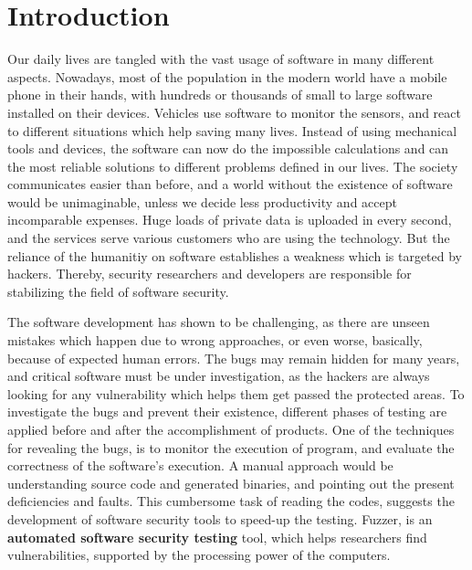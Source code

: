 \section{Introduction}
\label{sec:intro}


Our daily lives are tangled with the vast usage of software in many different aspects. Nowadays, most of the population in the modern world have a mobile phone in their hands, with hundreds or thousands of small to large software installed on their devices. Vehicles use software to monitor the sensors, and react to different situations which help saving many lives. Instead of using mechanical tools and devices, the software can now do the impossible calculations and can the most reliable solutions to different problems defined in our lives. The society communicates easier than before, and a world without the existence of software would be unimaginable, unless we decide less productivity and accept incomparable expenses. Huge loads of private data is uploaded in every second, and the services serve various customers who are using the technology. But the reliance of the humanitiy on software establishes a weakness which is targeted by hackers. Thereby, security researchers and developers are responsible for stabilizing the field of software security.


The software development has shown to be challenging, as there are unseen mistakes which happen due to wrong approaches, or even worse, basically, because of expected human errors. The bugs may remain hidden for many years, and critical software must be under investigation, as the hackers are always looking for any vulnerability which helps them get passed the protected areas. To investigate the bugs and prevent their existence, different phases of testing are applied before and after the accomplishment of products. One of the techniques for revealing the bugs, is to monitor the execution of program, and evaluate the correctness of the software's execution. A manual approach would be understanding source code and generated binaries, and pointing out the present deficiencies and faults. This cumbersome task of reading the codes, suggests the development of software security tools to speed-up the testing. Fuzzer, is an \textbf{automated software security testing} tool, which helps researchers find vulnerabilities, supported by the processing power of the computers.